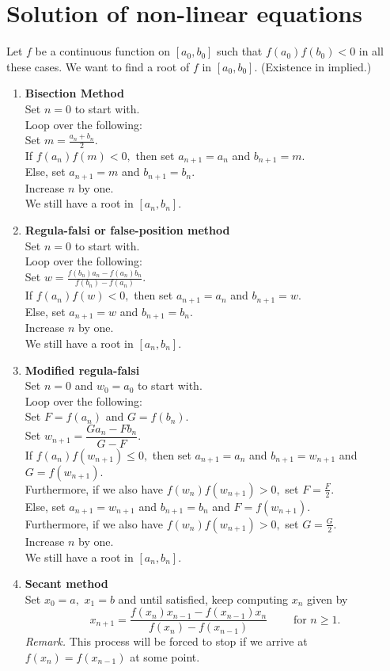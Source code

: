 \documentclass{article}
\begin{document}
\section{Solution of non-linear equations}
Let $f$ be a continuous function on $[a_0, b_0]$ such that $f(a_0)f(b_0) < 0$ in all these cases. We want to find a root of $f$ in $[a_0, b_0].$ (Existence in implied.)
\begin{enumerate} 
	\itemsep1em
	\item \textbf{Bisection Method}\\
	Set $n = 0$ to start with.\\
	Loop over the following:\\
	Set $m = \frac{a_n + b_n}{2}.$\\
	If $f(a_n)f(m) < 0,$ then set $a_{n+1} = a_n$ and $b_{n+1} = m.$\\
	Else, set $a_{n+1} = m$ and $b_{n+1} = b_n.$\\
	Increase $n$ by one.\\
	We still have a root in $[a_n, b_n].$
	\item \textbf{Regula-falsi or false-position method}\\
	Set $n = 0$ to start with.\\
	Loop over the following:\\
	Set $w = \frac{f(b_n)a_n - f(a_n)b_n}{f(b_n) - f(a_n)}.$\\
	If $f(a_n)f(w) < 0,$ then set $a_{n+1} = a_n$ and $b_{n+1} = w.$\\
	Else, set $a_{n+1} = w$ and $b_{n+1} = b_n.$\\
	Increase $n$ by one.\\
	We still have a root in $[a_n, b_n].$
	\item \textbf{Modified regula-falsi}\\
	Set $n = 0$ and $w_0 = a_0$ to start with.\\
	Loop over the following:\\
	Set $F = f(a_n)$ and $G = f(b_n).$\\
	Set $w_{n+1} = \dfrac{Ga_n -Fb_n}{G - F}.$\\
	If $f(a_n)f(w_{n+1}) \le 0,$ then set $a_{n+1} = a_n$ and $b_{n+1} = w_{n+1}$ and $G =f(w_{n+1}).$\\
	Furthermore, if we also have $f(w_{n})f(w_{n+1}) > 0,$ set $F = \frac{F}{2}.$\\
	Else, set $a_{n+1} = w_{n+1}$ and $b_{n+1} = b_n$ and $F = f(w_{n+1}).$\\
	Furthermore, if we also have $f(w_{n})f(w_{n+1}) > 0,$ set $G = \frac{G}{2}.$\\
	Increase $n$ by one.\\
	We still have a root in $[a_n, b_n].$	
	\item \textbf{Secant method}\\
	Set $x_0 = a,$ $x_1 = b$ and until satisfied, keep computing $x_n$ given by
	\[x_{n+1} = \frac{f(x_n)x_{n-1} - f(x_{n-1})x_n}{f(x_n) - f(x_{n-1})} \qquad \text{ for } n \ge 1.\]
	\emph{Remark.} This process will be forced to stop if we arrive at $f(x_n) = f(x_{n-1})$ at some point.
\end{enumerate}
\end{document}
